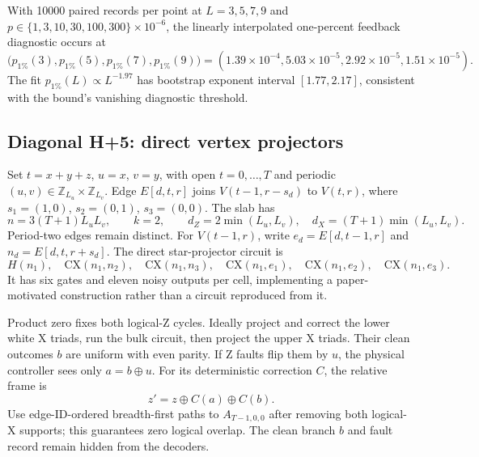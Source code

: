 \documentclass[11pt]{article}
\theoremstyle{definition}
\begin{document}
With 10000 paired records per point at $L=3,5,7,9$ and
$p\in\{1,3,10,30,100,300\}\times10^{-6}$, the linearly interpolated
one-percent feedback diagnostic occurs at
\[
 \bigl(p_{1\%}(3),p_{1\%}(5),p_{1\%}(7),p_{1\%}(9)\bigr)
 =(1.39\times10^{-4},5.03\times10^{-5},2.92\times10^{-5},1.51\times10^{-5}).
\]
The fit $p_{1\%}(L)\propto L^{-1.97}$ has bootstrap exponent interval
$[1.77,2.17]$, consistent with the bound's vanishing diagnostic threshold.

\subsection{Diagonal H+5: direct vertex projectors}

Set $t=x+y+z$, $u=x$, $v=y$, with open $t=0,\ldots,T$ and periodic
$(u,v)\in\mathbb Z_{L_u}\times\mathbb Z_{L_v}$. Edge $E[d,t,r]$ joins
$V(t-1,r-s_d)$ to $V(t,r)$, where
$s_1=(1,0)$, $s_2=(0,1)$, $s_3=(0,0)$. The slab has
\[
 n=3(T+1)L_uL_v,\qquad k=2,\qquad
 d_Z=2\min(L_u,L_v),\quad d_X=(T+1)\min(L_u,L_v).
\]
Period-two edges remain distinct. For $V(t-1,r)$, write
$e_d=E[d,t-1,r]$ and $n_d=E[d,t,r+s_d]$.
The direct star-projector circuit is
\[
 H(n_1),\quad
 \mathrm{CX}(n_1,n_2),\quad\mathrm{CX}(n_1,n_3),\quad
 \mathrm{CX}(n_1,e_1),\quad\mathrm{CX}(n_1,e_2),\quad
 \mathrm{CX}(n_1,e_3).
\]
It has six gates and eleven noisy outputs per cell, implementing a
paper-motivated construction rather than a circuit reproduced from it.

Product zero fixes both logical-Z cycles. Ideally project and correct the
lower white X triads, run the bulk circuit, then project the upper X triads.
Their clean outcomes $b$ are uniform with even parity. If Z faults flip
them by $u$, the physical controller sees only $a=b\oplus u$. For its
deterministic correction $C$, the relative frame is
\[
 z'=z\oplus C(a)\oplus C(b).
\]
Use edge-ID-ordered breadth-first paths to $A_{T-1,0,0}$ after removing
both logical-X supports; this guarantees zero logical overlap. The clean
branch $b$ and fault record remain hidden from the decoders.
\end{document}
